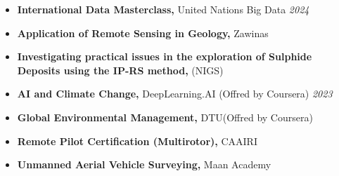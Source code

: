 \documentclass[letterpaper,11pt]{article}
\begin{document}
\begin{itemize}[left=0pt, label={}, topsep=7.5pt, partopsep=0pt, itemsep=6pt, parsep=0pt]
	\item \textbf{International Data Masterclass,} United Nations Big Data  \hfill \textit{2024}
	\end{itemize}
		\vspace{-1.2em} 
\begin{itemize}[left=0pt, label={}, topsep=7.5pt, partopsep=0pt, itemsep=6pt, parsep=0pt]
	\item \textbf{Application of Remote Sensing in Geology,} Zawinas
\end{itemize}
\vspace{-1.2em}
\begin{itemize}[left=0pt, label={}, topsep=7.5pt, partopsep=0pt, itemsep=6pt, parsep=0pt]
	\item \textbf{Investigating practical issues in the exploration of Sulphide Deposits using the IP-RS method,} (NIGS)\footnotemark[1]
\end{itemize}
\vspace{-1.2em}
\begin{itemize}[left=0pt, label={}, topsep=7.5pt, partopsep=0pt, itemsep=6pt, parsep=0pt]
	\item \textbf{AI and Climate Change,} DeepLearning.AI (Offred by Coursera)  \hfill \textit{2023}
\end{itemize}
\vspace{-1.2em}
\begin{itemize}[left=0pt, label={}, topsep=7.5pt, partopsep=0pt, itemsep=6pt, parsep=0pt]
	\item \textbf{Global Environmental Management,} DTU\footnotemark[2] (Offred by Coursera)  \hfill \textit{}
\end{itemize}
\vspace{-1.2em}
\begin{itemize}[left=0pt, label={}, topsep=7.5pt, partopsep=0pt, itemsep=6pt, parsep=0pt]
	\item \textbf{Remote Pilot Certification (Multirotor),} CAAIRI\footnotemark[3] \hfill \textit{}
\end{itemize}
\vspace{-1.2em}
\begin{itemize}[left=0pt, label={}, topsep=7.5pt, partopsep=0pt, itemsep=6pt, parsep=0pt]
	\item \textbf{Unmanned Aerial Vehicle Surveying,} Maan Academy  \hfill \textit{}
\end{itemize}
\vspace{-1.2em}
\end{document}
